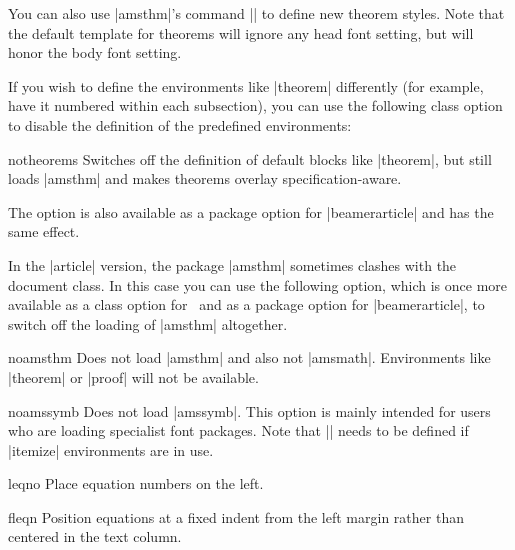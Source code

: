 You can also use |amsthm|'s command |\newtheoremstyle| to define new theorem styles. Note that the default template for theorems will ignore any head font setting, but will honor the body font setting.

If you wish to define the environments like |theorem| differently (for example, have it numbered within each subsection), you can use the following class option to disable the definition of the predefined environments:

\begin{classoption}{notheorems}
  Switches off the definition of default blocks like |theorem|, but still loads |amsthm| and makes theorems overlay specification-aware.
\end{classoption}

The option is also available as a package option for |beamerarticle| and has the same effect.

\articlenote
In the |article| version, the package |amsthm| sometimes clashes with the document class. In this case you can use the following option, which is once more available as a class option for \beamer\ and as a package option for |beamerarticle|, to switch off the loading of |amsthm| altogether.

\begin{classoption}{noamsthm}
  Does not load |amsthm| and also not |amsmath|. Environments like |theorem| or |proof| will not be available.
\end{classoption}

\begin{classoption}{noamssymb}
  Does not load |amssymb|. This option is mainly intended for users who are loading specialist font packages. Note that |\blacktriangleright| needs to be defined if |itemize| environments are in use.
\end{classoption}

\begin{classoption}{leqno}
  Place equation numbers on the left.
\end{classoption}

\begin{classoption}{fleqn}
  Position equations at a fixed indent from the left margin rather than centered in the text column.
\end{classoption}

